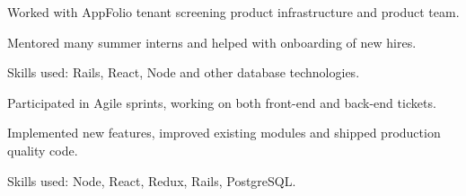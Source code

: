     \begin{tightemize}
      \item Worked with AppFolio tenant screening product infrastructure and product team.
      \item Mentored many summer interns and helped with onboarding of new hires.
      \item Skills used: Rails, React, Node and other database technologies.
    \end{tightemize}
    \sectionsep

    \begin{tightemize}
      \item Participated in Agile sprints, working on both front-end and back-end tickets.
      \item Implemented new features, improved existing modules and shipped production quality code.
      \item Skills used: Node, React, Redux, Rails, PostgreSQL.
    \end{tightemize}
    \sectionsep

